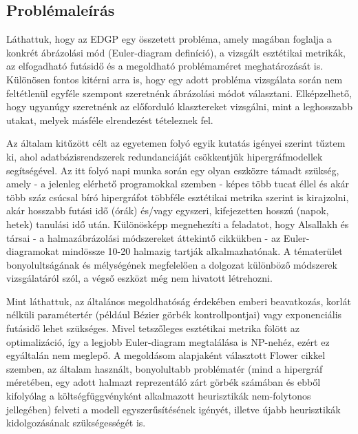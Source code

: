 \subsection{Problémaleírás}

Láthattuk, hogy az EDGP egy összetett probléma, amely magában foglalja a konkrét ábrázolási mód (Euler-diagram definíció), a vizsgált esztétikai metrikák, az elfogadható futásidő és a megoldható problémaméret meghatározását is. Különösen fontos kitérni arra is, hogy egy adott probléma vizsgálata során nem feltétlenül egyféle szempont szeretnénk ábrázolási módot választani. Elképzelhető, hogy ugyanúgy szeretnénk az előforduló klasztereket vizsgálni, mint a leghosszabb utakat, melyek másféle elrendezést tételeznek fel.


Az általam kitűzött célt az egyetemen folyó egyik kutatás igényei szerint tűztem ki, ahol adatbázisrendszerek redundanciáját csökkentjük hipergráfmodellek segítségével. Az itt folyó napi munka során egy olyan eszközre támadt szükség, amely - a jelenleg elérhető programokkal szemben - képes több tucat éllel és akár több száz csúcsal bíró hipergráfot többféle esztétikai metrika szerint is kirajzolni, akár hosszabb futási idő (órák) és/vagy egyszeri, kifejezetten hosszú (napok, hetek) tanulási idő után. Különösképp megnehezíti a feladatot, hogy Alsallakh és társai - a halmazábrázolási módszereket áttekintő cikkükben\cite{alsallakah2016_the_state_of_the_art_set_visualization} - az Euler-diagramokat mindössze 10-20 halmazig tartják alkalmazhatónak. A tématerület bonyolultságának és mélységének megfelelően a dolgozat különböző módszerek vizsgálatáról szól, a végső eszközt még nem hivatott létrehozni.


Mint láthattuk, az általános megoldhatóság érdekében emberi beavatkozás, korlát nélküli paramétertér (például Bézier görbék kontrollpontjai\cite{layout_metrics}) vagy exponenciális futásidő\cite{inductive_euler} lehet szükséges. Mivel tetszőleges esztétikai metrika fölött az optimalizáció, így a legjobb Euler-diagram megtalálása is NP-nehéz, ezért ez egyáltalán nem meglepő. A megoldásom alapjaként választott Flower cikkel\cite{layout_metrics} szemben, az általam használt, bonyolultabb problématér (mind a hipergráf méretében, egy adott halmazt reprezentáló zárt görbék számában és ebből kifolyólag a költségfüggvényként alkalmazott heurisztikák nem-folytonos jellegében) felveti a modell egyszerűsítésének igényét, illetve újabb heurisztikák kidolgozásának szükségességét is.


